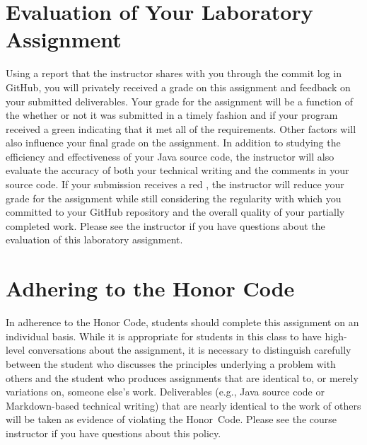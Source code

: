 \documentclass[11pt]{article}
\newcommand{\checkmark}{\ding{51}}
\newcommand{\naughtmark}{\ding{55}}
\begin{document}
\section*{Evaluation of Your Laboratory Assignment}

Using a report that the instructor shares with you through the commit log in GitHub, you will privately received a grade
on this assignment and feedback on your submitted deliverables. Your grade for the assignment will be a function of the
whether or not it was submitted in a timely fashion and if your program received a green \checkmark{} indicating that it
met all of the requirements. Other factors will also influence your final grade on the assignment. In addition to
studying the efficiency and effectiveness of your Java source code, the instructor will also evaluate the accuracy of
both your technical writing and the comments in your source code. If your submission receives a red \naughtmark{}, the
instructor will reduce your grade for the assignment while still considering the regularity with which you committed to
your GitHub repository and the overall quality of your partially completed work. Please see the instructor if you have
questions about the evaluation of this laboratory assignment.

\section*{Adhering to the Honor Code}

In adherence to the Honor Code, students should complete this assignment on an individual basis. While it is appropriate
for students in this class to have high-level conversations about the assignment, it is necessary to distinguish
carefully between the student who discusses the principles underlying a problem with others and the student who produces
assignments that are identical to, or merely variations on, someone else's work. Deliverables (e.g., Java source code or
Markdown-based technical writing) that are nearly identical to the work of others will be taken as evidence of violating
the \mbox{Honor Code}. Please see the course instructor if you have questions about this policy.
\end{document}

